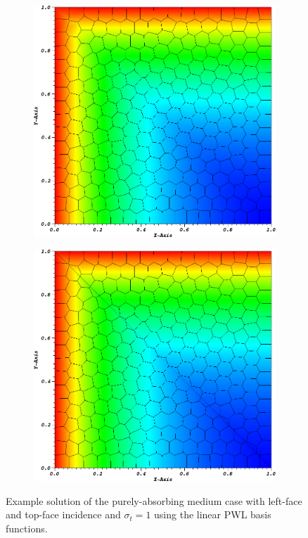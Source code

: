 \begin{figure}
{\begin{subfigure}[b]{0.485\textwidth}
	\end{subfigure}
}
\vspace{1cm}
{
	\begin{subfigure}[b]{0.485\textwidth}
		\centering
		\label{subfig::PA_Mesh_Poly}
		\includegraphics[width=\textwidth]{figures/sec_BF/PALeftTopSol_Poly.png}
	\end{subfigure}
	\hfill
	\begin{subfigure}[b]{0.485\textwidth}
		\centering
		\label{subfig::PA_Mesh_SplitPoly}
		\includegraphics[width=\textwidth]{figures/sec_BF/PALeftTopSol_SplitPoly.png}
	\end{subfigure}
}
\caption{Example solution of the purely-absorbing medium case with left-face and top-face incidence and $\sigma_t=1$ using the linear PWL basis functions.}
\label{fig::BF_Results_PA_LeftTop_Solutions}
\end{figure}

